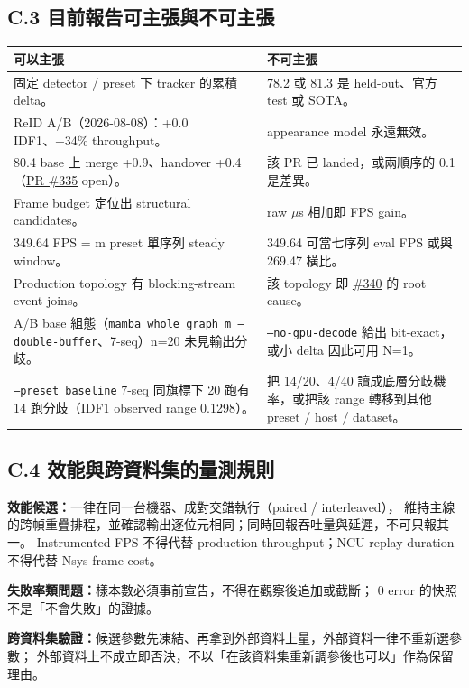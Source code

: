 \documentclass[10pt,a4paper]{ctexart}
\newcommand{\issue}[1]{\href{https://github.com/raylei50653/saccade/issues/#1}{\##1}}
\newcommand{\pr}[1]{\href{https://github.com/raylei50653/saccade/pull/#1}{PR \##1}}
\newcommand{\tighttable}{\small\setlength{\tabcolsep}{4pt}}
\begin{document}
\subsection{C.3 目前報告可主張與不可主張}\label{app:C3}

\tighttable
\begin{tabularx}{\linewidth}{@{}Y Y@{}}
\toprule
可以主張 & 不可主張\\
\midrule
固定 detector / preset 下 tracker 的累積 delta。 & 78.2 或 81.3 是 held-out、官方 test 或 SOTA。\\
ReID A/B（2026-08-08）：+0.0 IDF1、−34\% throughput。 & appearance model 永遠無效。\\
80.4 base 上 merge +0.9、handover +0.4（\pr{335} open）。 & 該 PR 已 landed，或兩順序的 0.1 是差異。\\
Frame budget 定位出 structural candidates。 & raw $\mu$s 相加即 FPS gain。\\
349.64 FPS = m preset 單序列 steady window。 & 349.64 可當七序列 eval FPS 或與 269.47 橫比。\\
Production topology 有 blocking-stream event joins。 & 該 topology 即 \issue{340} 的 root cause。\\
A/B base 組態（\texttt{mamba\_whole\_graph\_m --double-buffer}、7-seq）n=20 未見輸出分歧。 &
\texttt{--no-gpu-decode} 給出 bit-exact，或小 delta 因此可用 N=1。\\
\texttt{--preset baseline} 7-seq 同旗標下 20 跑有 14 跑分歧（IDF1 observed range 0.1298）。 &
把 14/20、4/40 讀成底層分歧機率，或把該 range 轉移到其他 preset / host / dataset。\\
\bottomrule
\end{tabularx}

\subsection{C.4 效能與跨資料集的量測規則}\label{app:C4}

\textbf{效能候選：}一律在同一台機器、成對交錯執行（paired / interleaved），
維持主線的跨幀重疊排程，並確認輸出逐位元相同；同時回報吞吐量與延遲，不可只報其一。
Instrumented FPS 不得代替 production throughput；NCU replay duration 不得代替 Nsys frame cost。

\textbf{失敗率類問題：}樣本數必須事前宣告，不得在觀察後追加或截斷；
0 error 的快照不是「不會失敗」的證據。

\textbf{跨資料集驗證：}候選參數先凍結、再拿到外部資料上量，外部資料一律不重新選參數；
外部資料上不成立即否決，不以「在該資料集重新調參後也可以」作為保留理由。
\end{document}
